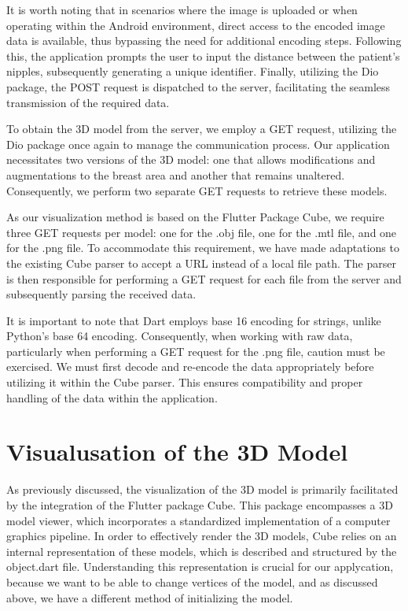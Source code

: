 It is worth noting that in scenarios where the image is uploaded or when operating within the Android environment, 
direct access to the encoded image data is available, thus bypassing the need for additional encoding steps. Following this, 
the application prompts the user to input the distance between the patient's nipples, subsequently generating a unique identifier. Finally, 
utilizing the Dio package, the POST request is dispatched to the server, facilitating the seamless transmission of the required data.

To obtain the 3D model from the server, we employ a GET request, utilizing the Dio package once again to manage the communication process. 
Our application necessitates two versions of the 3D model: one that allows modifications and augmentations to the breast area and another 
that remains unaltered. Consequently, we perform two separate GET requests to retrieve these models.

As our visualization method is based on the Flutter Package Cube, we require three GET requests per model: one for the .obj file, one for 
the .mtl file, and one for the .png file. To accommodate this requirement, we have made adaptations to the existing Cube parser to accept 
a URL instead of a local file path. The parser is then responsible for performing a GET request for each file from the server and subsequently parsing the received data.

It is important to note that Dart employs base 16 encoding for strings, unlike Python's base 64 encoding. Consequently, when working with raw data, 
particularly when performing a GET request for the .png file, caution must be exercised. We must first decode and re-encode the data appropriately 
before utilizing it within the Cube parser. This ensures compatibility and proper handling of the data within the application.

\section{Visualusation of the 3D Model}

As previously discussed, the visualization of the 3D model is primarily facilitated by the integration of the Flutter package Cube. 
This package encompasses a 3D model viewer, which incorporates a standardized implementation of a computer graphics pipeline. 
In order to effectively render the 3D models, Cube relies on an internal representation of these models, which is described and structured by the object.dart file.
Understanding this representation is crucial for our applycation, because we want to be able to change vertices of the model, and as discussed above,
we have a different method of initializing the model.

